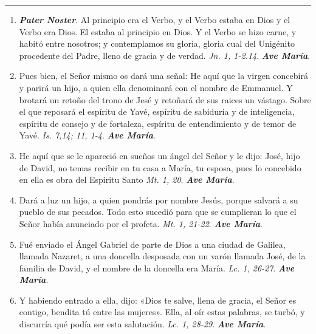 \documentclass[11pt,a4paper]{book}
\begin{document}
    \rule{\textwidth}{0.5pt}
    \begin{enumerate}

        \item \textbf{\emph{Pater Noster}}. Al principio era el Verbo, y el Verbo estaba en Dios y el Verbo era Dios. El estaba al principio en Dios. Y el Verbo se hizo carne, 
                y habitó entre nosotros; y contemplamos su gloria, gloria cual del Unigénito procedente del Padre, lleno de gracia y de verdad. 
                \emph{Jn. 1, 1-2.14}. \textbf{\emph{Ave María}}.

        \item Pues bien, el Señor mismo os dará una señal: He aquí que la virgen concebirá y parirá un hijo, 
                a quien ella denominará con el nombre de Emmanuel. Y brotará un retoño del trono de Jesé y retoñará de sus raices un vástago. 
                Sobre el que reposará el espíritu de Yavé, espíritu de sabiduría y de inteligencia, espíritu de consejo y de fortaleza, espíritu 
                de entendimiento y de temor de Yavé. \emph{Is. 7,14; 11, 1-4}. \textbf{\emph{Ave María}}.                

        \item He aquí que se le apareció en sueños un ángel del Señor y le dijo: José, hijo de David, no temas recibir en tu casa a María, tu esposa,
                pues lo concebido en ella es obra del Espiritu Santo \emph{Mt. 1, 20}. \textbf{\emph{Ave María}}.

        \item Dará a luz un hijo, a quien pondrás por nombre Jesús, porque salvará a su pueblo de sus pecados. Todo esto sucedió para que se cumplieran
                lo que el Señor había anunciado por el profeta. \emph{Mt. 1, 21-22}. \textbf{\emph{Ave María}}.
    
        \item Fué enviado el Ángel Gabriel de parte de Dios a una ciudad de Galilea, llamada Nazaret, 
                a una doncella desposada con un varón llamada José, de la familia de David, y el nombre de la doncella era María. \emph{Lc. 1, 26-27}. \textbf{\emph{Ave María}}.

        \item Y habiendo entrado a ella, dijo: «Dios te salve, llena de gracia, el Señor es contigo, bendita tú entre las mujeres». 
                Ella, al oír estas palabras, se turbó, y discurría qué podía ser esta salutación. \emph{Lc. 1, 28-29}. \textbf{\emph{Ave María}}.


\end{enumerate}
\end{document}
